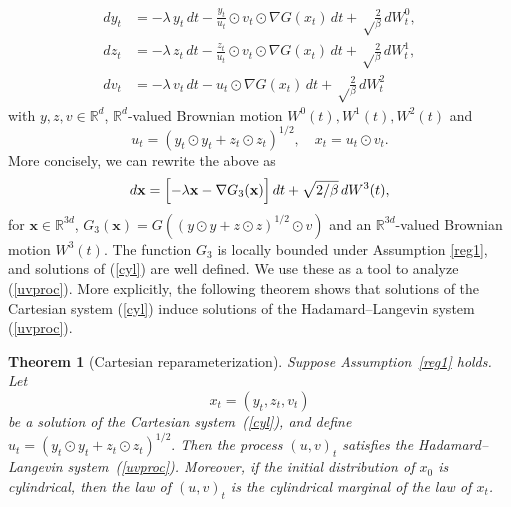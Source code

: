 \documentclass[11pt, twoside]{report}
\newtheorem{theorem}{Theorem}[section]
\renewcommand{\vec}[1]{{\mathbf{#1}}}
\begin{document}
\begin{equation} 
\begin{split} 
dy_t&=-\lambda\,   y_t\,dt - \frac{y_t}{u_t} \odot v_t\odot \nabla G(x_t)\,dt
 +\sqrt\frac{2}{\beta}\,dW^0_t,\\
dz_t&=-\lambda\,   z_t\,dt - \frac{z_t}{u_t} \odot v_t\odot \nabla G(x_t)\,dt
 +\sqrt\frac{2}{\beta}\,dW^1_t,\\
dv_t&=-\lambda\,   v_t\,dt - u_t\odot \nabla G(x_t)\,dt
 +\sqrt\frac{2}{\beta}\,dW^2_t
\label{yzvproc}
\end{split}
\end{equation}
with $y,z,v \in \mathbb{R}^d$, $\mathbb{R}^{d}$-valued Brownian motion $W^0(t), W^1(t), W^2(t)$ and
\[u_t = (y_t \odot y_t + z_t \odot z_t)^{1/2}, \quad x_t = u_t \odot v_t.\]
More concisely, we can rewrite the above as 
\begin{equation}  
 \begin{aligned}
 d\vec x= \Bigl[-\lambda \vec x - \nabla G_{3}(\vec x)\Bigr]\,dt +\sqrt{2/\beta}\, dW^3(t),
  \end{aligned}\label{cyl}
\end{equation}
for $\vec x \in \mathbb{R}^{3d}$, $G_{3}(\vec x)= G( (y\odot y + z\odot z)^{1/2} \odot v)$ and an $\mathbb{R}^{3d}$-valued Brownian motion $W^3(t)$. The function $G_{3}$ is locally bounded under Assumption \ref{reg1}, and solutions of (\ref{cyl}) are well defined. We use these as a tool to analyze (\ref{uvproc}). More explicitly, the following theorem shows that solutions of the Cartesian system
(\ref{cyl}) induce solutions of the Hadamard--Langevin system (\ref{uvproc}).

\begin{theorem}[Cartesian reparameterization]
\label{thm:cartesian_reparam}
Suppose Assumption~\ref{reg1} holds. Let
\[
x_t=(y_t,z_t,v_t)
\]
be a solution of the Cartesian system~(\ref{cyl}), and define $u_t=(y_t\odot y_t+z_t\odot z_t)^{1/2}.$ Then the process $(u,v)_t$ satisfies the Hadamard--Langevin system~(\ref{uvproc}). Moreover, if the initial distribution of \(x_0\) is cylindrical, then the law of
\((u,v)_t\) is the cylindrical marginal of the law of \(x_t\).
\end{theorem}
\end{document}
